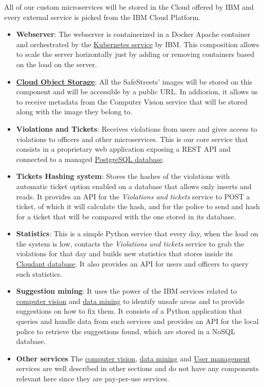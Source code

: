 All of our custom microservices will be stored in the Cloud offered by IBM and every external service is picked from the IBM Cloud Platform.
\begin{itemize}
	\item \textbf{Webserver}: The webserver is containerized in a Docker Apache container and orchestrated by the \hyperlink{kubernetes}{Kubernetes service} by IBM.
	This composition allows to scale the server horizontally just by adding or removing containers based on the load on the server.
	
	\item \hyperlink{cloudObjectStorage}{\textbf{Cloud Object Storage}}: All the SafeStreets' images will be stored on this component and will be accessible by a public URL. In addiorion, it allows us to receive metadata from the Computer Vision service that will be stored along with the image they belong to.
	
	\item \textbf{Violations and Tickets}: Receives violations from users and gives access to violations to officers and other microservices. This is our core service that consists in a proprietary web application exposing a REST API and connected to a managed \hyperlink{postgres}{PostgreSQL database}.
	
	\item \textbf{Tickets Hashing system}: Stores the hashes of the violations with automatic ticket option enabled on a database that allows only inserts and reads.
	It provides an API for the \textit{Violations and tickets} service to POST a ticket, of which it will calculate the hash, and for the police to send and hash for a ticket that will be compared with the one stored in its database.
	
	\item \textbf{Statistics}: This is a simple Python service that every day, when the load on the system is low, contacts the \textit{Violations and tickets} service to grab the violations for that day and builds new statistics that stores inside its \hyperlink{cloudant}{Cloudant database}.
	It also provides an API for users and officers to query such statistics.
	
	\item \textbf{Suggestion mining}: It uses the power of the IBM services related to \hyperlink{watson}{computer vision} and \hyperlink{discovery}{data mining} to identify unsafe areas and to provide suggestions on how to fix them. It consists of a Python application that queries and handle data from such services and provides an API for the local police to retrieve the suggestions found, which are stored in a NoSQL database.
	
	\item \textbf{Other services}
	The \hyperlink{watson}{computer vision}, \hyperlink{discovery}{data mining} and \hyperlink{appid}{User management} services are well described in other sections and do not have any components relevant here since they are pay-per-use services.
\end{itemize}